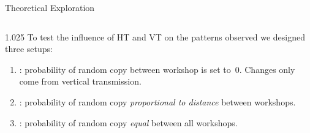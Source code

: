 \documentclass[final]{beamer}
\newlength{\onecolwid}
\newlength{\twocolwid}
\begin{document}
\begin{frame}[t]
\begin{columns}[t]
\begin{column}{\twocolwid}
\begin{block}{Theoretical Exploration}
\begin{columns}[t,totalwidth=\twocolwid]
\begin{column}{1.025\onecolwid}
To test the influence of HT and VT on the patterns observed we designed three setups:\\
\begin{enumerate}
    \item  {}: probability of random copy between workshop is set to~$0$. Changes only come from vertical transmission.\\
    \item {}: probability of random copy \emph{proportional to distance} between workshops. \\
    \item  {}: probability of random copy \emph{equal} between all workshops. \\
\end{enumerate}
\end{column}


\end{columns}
\end{block}
\end{column}
\end{columns}
\end{frame}
\end{document}
